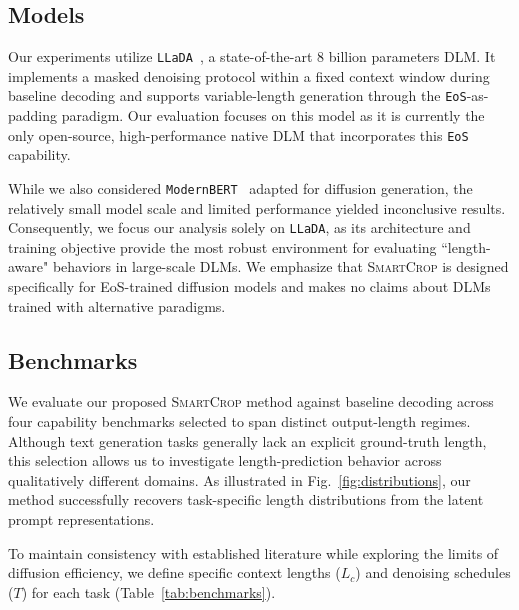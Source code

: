 \documentclass{article}
\theoremstyle{plain}
\theoremstyle{definition}
\theoremstyle{remark}
\begin{document}

\subsection{Models}

Our experiments utilize \texttt{LLaDA}~\citep{nie2025large}, a state-of-the-art 8 billion parameters DLM. It implements a masked denoising protocol within a fixed context window during baseline decoding and supports variable-length generation through the \texttt{EoS}-as-padding paradigm. Our evaluation focuses on this model as it is currently the only open-source, high-performance native DLM that incorporates this \texttt{EoS} capability.

While we also considered \texttt{ModernBERT}~\citep{dllm} adapted for diffusion generation, the relatively small model scale and limited performance yielded inconclusive results. Consequently, we focus our analysis solely on \texttt{LLaDA}, as its architecture and training objective provide the most robust environment for evaluating ``length-aware" behaviors in large-scale DLMs.
We emphasize that \textsc{SmartCrop} is designed specifically for EoS-trained diffusion models and makes no claims about DLMs trained with alternative paradigms.


\subsection{Benchmarks}

We evaluate our proposed \textsc{SmartCrop} method against baseline decoding across four capability benchmarks selected to span distinct output-length regimes. Although text generation tasks generally lack an explicit ground-truth length, this selection allows us to investigate length-prediction behavior across qualitatively different domains. As illustrated in Fig.~\ref{fig:distributions}, our method successfully recovers task-specific length distributions from the latent prompt representations.

To maintain consistency with established literature while exploring the limits of diffusion efficiency, we define specific context lengths ($L_c$) and denoising schedules ($T$) for each task (Table~\ref{tab:benchmarks}).
\end{document}
